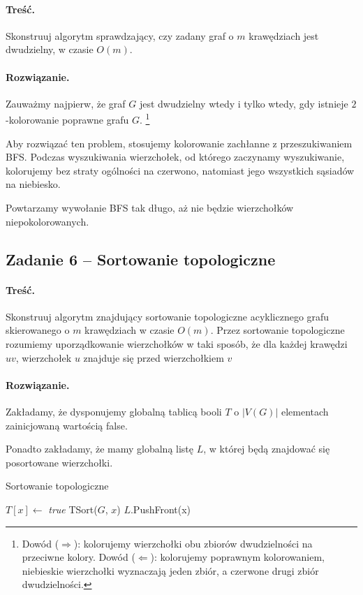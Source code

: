 \paragraph{Treść.} Skonstruuj algorytm sprawdzający, 
czy zadany graf o $m$ krawędziach jest dwudzielny, w czasie $O(m)$.

\paragraph{Rozwiązanie.} Zauważmy najpierw, że 
graf $G$ jest dwudzielny wtedy i tylko wtedy, gdy istnieje $2$-kolorowanie
poprawne grafu $G$. \footnote{Dowód ($\Rightarrow$): kolorujemy 
wierzchołki obu zbiorów dwudzielności na przeciwne kolory. Dowód 
($\Leftarrow$): kolorujemy poprawnym kolorowaniem, niebieskie
wierzchołki wyznaczają jeden zbiór, a czerwone drugi zbiór dwudzielności.} 

Aby rozwiązać ten problem, stosujemy kolorowanie 
zachłanne z przeszukiwaniem BFS. %
Podczas wyszukiwania wierzchołek, od którego zaczynamy 
wyszukiwanie, kolorujemy 
bez straty ogólności na czerwono, natomiast jego
wszystkich sąsiadów na niebiesko.

Powtarzamy wywołanie BFS tak długo, aż nie będzie 
wierzchołków niepokolorowanych.

\subsection{Zadanie 6 -- Sortowanie topologiczne}
\label{zad:tsort}
\paragraph{Treść.} Skonstruuj algorytm znajdujący 
sortowanie topologiczne acyklicznego grafu skierowanego 
o $m$ krawędziach w czasie $O(m)$. 
Przez sortowanie topologiczne rozumiemy uporządkowanie 
wierzchołków w taki sposób, że dla
każdej krawędzi $uv$, wierzchołek $u$ znajduje się przed 
wierzchołkiem $v$

\paragraph{Rozwiązanie.} Zakładamy, że dysponujemy globalną
tablicą booli $T$ o $|V(G)|$ elementach zainicjowaną wartością 
\textsf{false}.

Ponadto zakładamy, że mamy globalną listę $L$, w której 
będą znajdować się posortowane wierzchołki.

\begin{algorithm}[H]
	\caption{Sortowanie topologiczne}
	\begin{algorithmic}[1]
		\State $T[x] \gets$ \textit{true}
		\State TSort($G$, $x$)
		\EndIf
		\EndWhile
		\State $L$.PushFront(x)
		\EndProcedure
	\end{algorithmic}
	\label{Zadanie26}
\end{algorithm}

